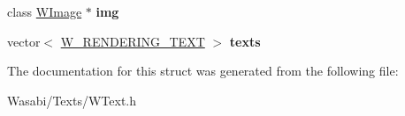 \begin{DoxyCompactItemize}
\item 
class \hyperlink{class_w_image}{W\+Image} $\ast$ {\bfseries img}\hypertarget{struct_w___f_o_n_t___o_b_j_e_c_t_aeb5dce8b0ceac2046f3f75c589323ace}{}\label{struct_w___f_o_n_t___o_b_j_e_c_t_aeb5dce8b0ceac2046f3f75c589323ace}

\item 
vector$<$ \hyperlink{struct_w___r_e_n_d_e_r_i_n_g___t_e_x_t}{W\+\_\+\+R\+E\+N\+D\+E\+R\+I\+N\+G\+\_\+\+T\+E\+XT} $>$ {\bfseries texts}\hypertarget{struct_w___f_o_n_t___o_b_j_e_c_t_ad134e622cb6080cf466dd16676bbb5e0}{}\label{struct_w___f_o_n_t___o_b_j_e_c_t_ad134e622cb6080cf466dd16676bbb5e0}

\end{DoxyCompactItemize}


The documentation for this struct was generated from the following file\+:\begin{DoxyCompactItemize}
\item 
Wasabi/\+Texts/W\+Text.\+h\end{DoxyCompactItemize}
